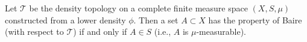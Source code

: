 Let $\mathcal{T}$ be the density topology on a complete finite measure space $(X, S, \mu)$ constructed from a lower density $\phi$. Then a set $A \subset X$ has the property of Baire (with respect to $\mathcal{T}$) if and only if $A \in S$ (i.e., $A$ is $\mu$-measurable).

